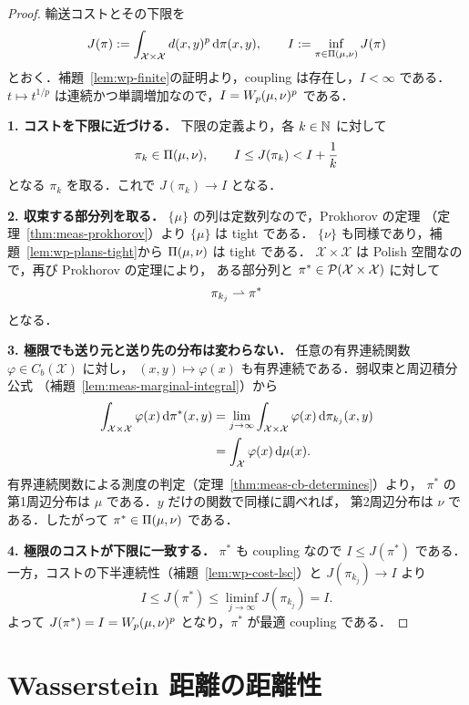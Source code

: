 \begin{proof}
  輸送コストとその下限を
  \[
    J(\pi):=\int_{\mathcal{X}\times\mathcal{X}}d(x,y)^p\,\mathrm{d}\pi(x,y),
    \qquad
    I:=\inf_{\pi\in\Pi(\mu,\nu)}J(\pi)
  \]
  とおく．補題~\ref{lem:wp-finite}の証明より，coupling は存在し，$I<\infty$ である．
  $t\mapsto t^{1/p}$ は連続かつ単調増加なので，$I=W_p(\mu,\nu)^p$ である．

  \textbf{1. コストを下限に近づける．}
  下限の定義より，各 $k\in\mathbb{N}$ に対して
  \[
    \pi_k\in\Pi(\mu,\nu),
    \qquad
    I\leq J(\pi_k)<I+\frac1k
  \]
  となる $\pi_k$ を取る．これで $J(\pi_k)\to I$ となる．

  \textbf{2. 収束する部分列を取る．}
  $\{\mu\}$ の列は定数列なので，Prokhorov の定理
  （定理~\ref{thm:meas-prokhorov}）より $\{\mu\}$ は tight である．
  $\{\nu\}$ も同様であり，補題~\ref{lem:wp-plans-tight}から
  $\Pi(\mu,\nu)$ は tight である．
  $\mathcal{X}\times\mathcal{X}$ は Polish 空間なので，再び Prokhorov の定理により，
  ある部分列と $\pi^*\in\mathcal{P}(\mathcal{X}\times\mathcal{X})$ に対して
  \[
    \pi_{k_j}\rightharpoonup\pi^*
  \]
  となる．

  \textbf{3. 極限でも送り元と送り先の分布は変わらない．}
  任意の有界連続関数 $\varphi\in C_b(\mathcal{X})$ に対し，
  $(x,y)\mapsto\varphi(x)$ も有界連続である．弱収束と周辺積分公式
  （補題~\ref{lem:meas-marginal-integral}）から
  \[
    \begin{aligned}
      \int_{\mathcal{X}\times\mathcal{X}}\varphi(x)\,\mathrm{d}\pi^*(x,y)
      &=\lim_{j\to\infty}
        \int_{\mathcal{X}\times\mathcal{X}}\varphi(x)\,\mathrm{d}\pi_{k_j}(x,y)\\
      &=\int_\mathcal{X}\varphi(x)\,\mathrm{d}\mu(x).
    \end{aligned}
  \]
  有界連続関数による測度の判定（定理~\ref{thm:meas-cb-determines}）より，
  $\pi^*$ の第1周辺分布は $\mu$ である．$y$ だけの関数で同様に調べれば，
  第2周辺分布は $\nu$ である．したがって $\pi^*\in\Pi(\mu,\nu)$ である．

  \textbf{4. 極限のコストが下限に一致する．}
  $\pi^*$ も coupling なので $I\leq J(\pi^*)$ である．
  一方，コストの下半連続性（補題~\ref{lem:wp-cost-lsc}）と $J(\pi_{k_j})\to I$ より
  \[
    I\leq J(\pi^*)\leq\liminf_{j\to\infty}J(\pi_{k_j})=I.
  \]
  よって $J(\pi^*)=I=W_p(\mu,\nu)^p$ となり，$\pi^*$ が最適 coupling である．
\end{proof}

\section{Wasserstein 距離の距離性}
\label{sec:metric-property}

